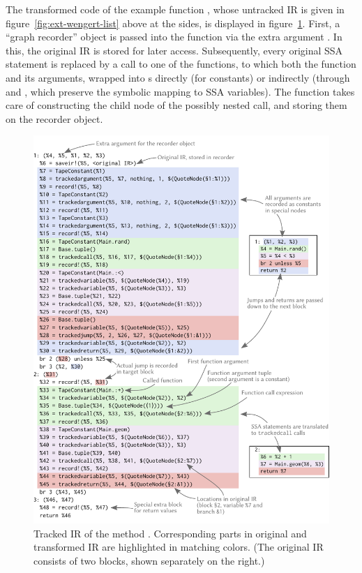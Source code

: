 The transformed code of the example function , whose untracked IR is given in
figure~\ref{fig:ext-wengert-list} above at the sides, is displayed in figure~\ref{fig:geom-tracked}.
First, a \enquote{graph recorder} object is passed into the function via the extra argument
.  In this, the original IR is stored for later access.  Subsequently, every original SSA
statement is replaced by a call to one of the \protect{} functions, to which both the
function and its arguments, wrapped into s directly (for constants) or
indirectly (through  and , which preserve the symbolic
mapping to SSA variables).  The   function takes care of constructing the child node
of the possibly nested call, and storing them on the recorder object.

\begin{figure}[p]
  \includegraphics[width=\textwidth]{figures/translation}
  \caption{Tracked IR of the method \protect{}.  Corresponding parts in
    original and transformed IR are highlighted in matching colors.  (The original IR consists of
    two blocks, shown separately on the right.)\label{fig:geom-tracked}}
\end{figure}

